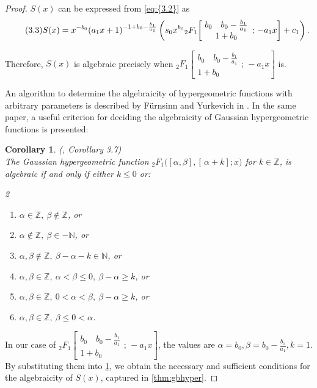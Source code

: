 \documentclass[11pt]{article}
\theoremstyle{definition}
\theoremstyle{plain}
\newtheorem{cor}[defi]{Corollary}
\theoremstyle{remark}
\begin{document}
\begin{proof}
$S(x)$ can be expressed from \eqref{eq:{3.2}} as
\begin{equation}\label{eq:{3.3}}\tag{3.3}
S(x) = x^{-b_0}(a_1x + 1)^{-1+b_0 - \frac{b_1}{a_1}} \left(s_0x^{b_0} {}_{2}F_{1}\!\left[\!\begin{array}{c} b_0 \quad b_0-\frac{b_1}{a_1}\\1+b_0
\end{array}
; \, -a_1x
\right] + c_1\right).
\end{equation}

Therefore, $S(x)$ is algebraic precisely when ${}_{2}F_{1}\!\left[\!\begin{array}{c} b_0 \quad b_0-\frac{b_1}{a_1}\\1+b_0
\end{array}
; \, -a_1x
\right]$ is.

An algorithm to determine the algebraicity of hypergeometric functions with arbitrary parameters is described by Fürnsinn and Yurkevich in \cite{FY24}. In the same paper, a useful criterion for deciding the algebraicity of Gaussian hypergeometric functions is presented:

\begin{cor}\label{cor:gaussalg}
(\cite{FY24}, Corollary 3.7) \\
The Gaussian hypergeometric function ${}_{2}F_{1}\!\bigl([\alpha,\beta],[\,\alpha+k];x\bigr)$ for $k\in\mathbb Z$,
is algebraic if and only if either $k\le 0$ or:
\begin{multicols}{2}
\begin{enumerate}
  \item $\alpha\in\mathbb Z,\ \beta\notin\mathbb Z$, or 
  \item $\alpha\notin\mathbb Z,\ \beta\in-\mathbb N$, or 
  \item $\alpha,\beta\notin\mathbb Z,\ \beta-\alpha-k\in\mathbb N$, or 
  \item $\alpha,\beta\in\mathbb Z,\ \alpha<\beta\le 0,\ \beta-\alpha\ge k$, or 
  \item $\alpha,\beta\in\mathbb Z,\ 0<\alpha<\beta,\ \beta-\alpha\ge k$, or
  \item $\alpha,\beta\in\mathbb Z,\ \beta\le 0<\alpha$.
\end{enumerate}
\end{multicols}
\end{cor}

In our case of ${}_{2}F_{1}\left[\!\begin{array}{c} b_0 \quad b_0-\frac{b_1}{a_1}\\1+b_0
\end{array}
; \, -a_1x
\right]$, the values are $\alpha = b_0, \beta = b_0-\frac{b_1}{a_1}, k = 1$. By substituting them into \cref{cor:gaussalg}, we obtain the necessary and sufficient conditions for the algebraicity of $S(x)$, captured in \cref{thm:gbhyper}.


\end{proof}
\end{document}
